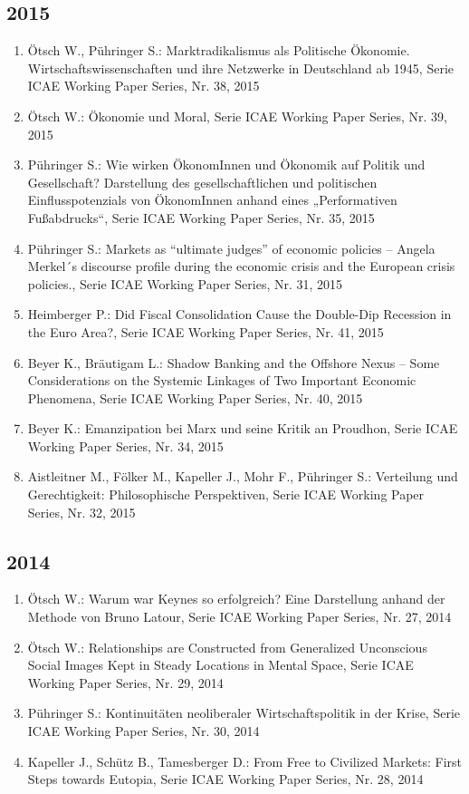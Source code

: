 \subsection*{2015}
\begin{enumerate}
    	 \item Ötsch W., Pühringer S.: Marktradikalismus als Politische Ökonomie. Wirtschaftswissenschaften und ihre Netzwerke in Deutschland ab 1945, Serie ICAE Working Paper Series, Nr. 38, 2015
	 \item Ötsch W.: Ökonomie und Moral, Serie ICAE Working Paper Series, Nr. 39, 2015
	 \item Pühringer S.: Wie wirken ÖkonomInnen und Ökonomik auf Politik und Gesellschaft? Darstellung des gesellschaftlichen und politischen Einflusspotenzials von ÖkonomInnen anhand eines „Performativen Fußabdrucks“, Serie ICAE Working Paper Series, Nr. 35, 2015
	 \item Pühringer S.: Markets as “ultimate judges” of economic policies -- Angela Merkel´s discourse profile during the economic crisis and the European crisis policies., Serie ICAE Working Paper Series, Nr. 31, 2015
	 \item Heimberger P.: Did Fiscal Consolidation Cause the Double-Dip Recession in the Euro Area?, Serie ICAE Working Paper Series, Nr. 41, 2015
	 \item Beyer K., Bräutigam L.: Shadow Banking and the Offshore Nexus -- Some Considerations on the Systemic Linkages of Two Important Economic Phenomena, Serie ICAE Working Paper Series, Nr. 40, 2015
	 \item Beyer K.: Emanzipation bei Marx und seine Kritik an Proudhon, Serie ICAE Working Paper Series, Nr. 34, 2015
	 \item Aistleitner M., Fölker M., Kapeller J., Mohr F., Pühringer S.: Verteilung und Gerechtigkeit: Philosophische Perspektiven, Serie ICAE Working Paper Series, Nr. 32, 2015
\end{enumerate}
\subsection*{2014}
\begin{enumerate}
    	 \item Ötsch W.: Warum war Keynes so erfolgreich? Eine Darstellung anhand der Methode von Bruno Latour, Serie ICAE Working Paper Series, Nr. 27, 2014
	 \item Ötsch W.: Relationships are Constructed from Generalized Unconscious Social Images Kept in Steady Locations in Mental Space, Serie ICAE Working Paper Series, Nr. 29, 2014
	 \item Pühringer S.: Kontinuitäten neoliberaler Wirtschaftspolitik in der Krise, Serie ICAE Working Paper Series, Nr. 30, 2014
	 \item Kapeller J., Schütz B., Tamesberger D.: From Free to Civilized Markets: First Steps towards Eutopia, Serie ICAE Working Paper Series, Nr. 28, 2014
\end{enumerate}
